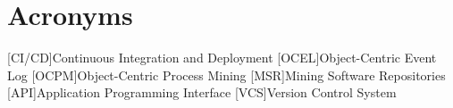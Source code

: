 \chapter*{Acronyms}
\begin{acronym}
[CI/CD]{Continuous Integration and Deployment}
[OCEL]{Object-Centric Event Log}
[OCPM]{Object-Centric Process Mining}
[MSR]{Mining Software Repositories}
[API]{Application Programming Interface}
[VCS]{Version Control System}
\end{acronym}